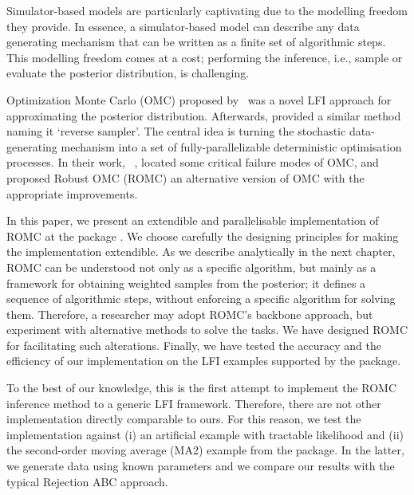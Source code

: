 Simulator-based models are particularly captivating due to the
modelling freedom they provide. In essence, a simulator-based model can
describe any data generating mechanism that can be written as a finite
set of algorithmic steps. This modelling freedom comes at a cost;
performing the inference, i.e., sample or evaluate the posterior
distribution, is challenging.

Optimization Monte Carlo (OMC) proposed by~\citet{Meeds2015} was a
novel LFI approach for approximating the posterior
distribution. Afterwards, \citet{Forneron2016} provided a similar
method naming it `reverse sampler'. The central idea is turning the
stochastic data-generating mechanism into a set of
fully-parallelizable deterministic optimisation processes. In their
work, ~\citet{Ikonomov2019}, located some critical failure modes of
OMC, and proposed Robust OMC (ROMC) an alternative version of OMC with
the appropriate improvements.

In this paper, we present an extendible and parallelisable
implementation of ROMC at the  package . We choose carefully the
designing principles for making the implementation extendible. As we
describe analytically in the next chapter, ROMC can be understood not
only as a specific algorithm, but mainly as a framework for obtaining
weighted samples from the posterior; it defines a sequence of
algorithmic steps, without enforcing a specific algorithm for solving
them. Therefore, a researcher may adopt ROMC's backbone approach, but
experiment with alternative methods to solve the tasks. We have
designed ROMC for facilitating such alterations. Finally, we have
tested the accuracy and the efficiency of our implementation on the
LFI examples supported by the  package.

To the best of our knowledge, this is the first attempt to implement
the ROMC inference method to a generic LFI framework. Therefore, there
are not other implementation directly comparable to ours. For this
reason, we test the implementation against (i) an artificial example
with tractable likelihood and (ii) the second-order moving average
(MA2) example from the  package. In the latter, we generate
data using known parameters and we compare our results with the
typical Rejection ABC approach.
